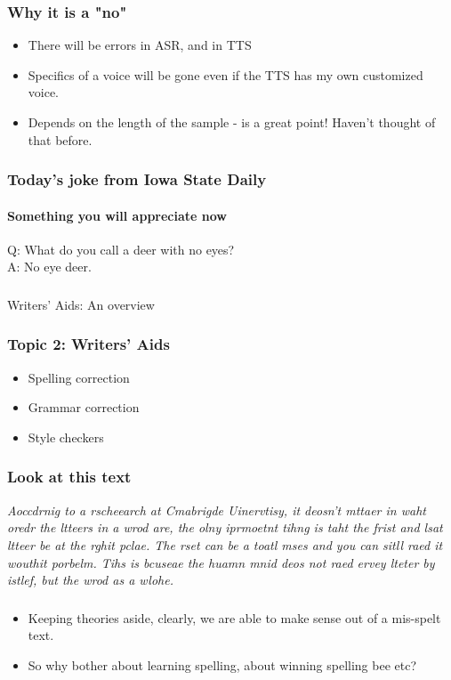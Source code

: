 \documentclass{beamer}
\begin{document}
\begin{frame}
\frametitle{Why it is a "no"}
\begin{itemize}
\item There will be errors in ASR, and in TTS
\item Specifics of a voice will be gone even if the TTS has my own customized voice.
\item Depends on the length of the sample - is a great point! Haven't thought of that before. 
\end{itemize}
\end{frame}

\begin{frame}
\frametitle{Today's joke from Iowa State Daily}
\framesubtitle{Something you will appreciate now}
Q: What do you call a deer with no eyes? \pause \\
A: No eye deer.
\end{frame}

\begin{frame}
\frametitle{}
\begin{center}
\Large Writers' Aids: An overview
\end{center}
\end{frame}

\begin{frame}
\frametitle{Topic 2: Writers' Aids}
\begin{itemize}
\item Spelling correction
\item Grammar correction
\item Style checkers
\end{itemize}
\end{frame}

\begin{frame}
\frametitle{Look at this text} \small
\textit{Aoccdrnig to a rscheearch at Cmabrigde Uinervtisy, it deosn't mttaer in waht oredr the ltteers in a wrod are, the olny iprmoetnt tihng is taht the frist and lsat ltteer be at the rghit pclae. The rset can be a toatl mses and you can sitll raed it wouthit porbelm. Tihs is bcuseae the huamn mnid deos not raed ervey lteter by istlef, but the wrod as a wlohe.}
\end{frame}

\begin{frame}
\frametitle{}
\begin{itemize}
\item Keeping theories aside, clearly, we are able to make sense out of a mis-spelt text.
\item So why bother about learning spelling, about winning spelling bee etc? \pause
\end{itemize}
\end{frame}
\end{document}
